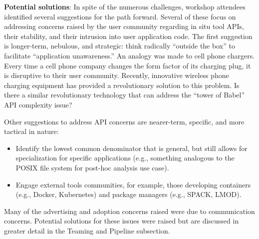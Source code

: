 \textbf{Potential solutions}: In spite of the numerous challenges, workshop attendees identified several suggestions for the path forward.  Several of these focus on addressing concerns raised by the user community regarding in situ tool APIs, their stability, and their intrusion into user application code.   The first suggestion is longer-term, nebulous, and strategic: think radically ``outside the box'' to facilitate ``application unawareness.''  An analogy was made to cell phone chargers.  Every time a cell phone company changes the form factor of its charging plug, it is disruptive to their user community.  Recently, innovative wireless phone charging equipment has provided a revolutionary solution to this problem. Is there a similar revolutionary technology that can address the ``tower of Babel'' API complexity issue? 

Other suggestions to address API concerns are nearer-term, specific, and more tactical in nature:
\begin{itemize}
\item Identify the lowest common denominator that is general, but still allows for specialization for specific applications (e.g., something analogous to the POSIX file system for post-hoc analysis use case).  
\item Engage external tools communities, for example, those developing containers (e.g., Docker, Kubernetes)  and package managers (e.g., SPACK, LMOD). 
\end{itemize}

Many of the advertising and adoption concerns raised were due to communication concerns.  Potential solutions for these issues were raised but are discussed in greater detail in the Teaming and Pipeline subsection.

